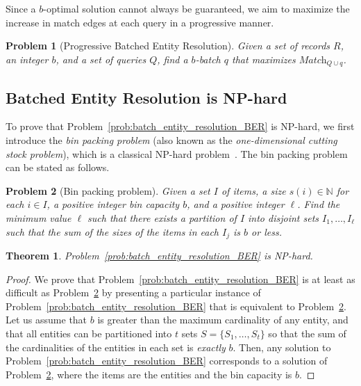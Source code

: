 \documentclass[sigconf, nonacm]{acmart}
\newcommand{\match}{\textit{Match}\xspace}
\newtheorem{theorem}{Theorem}[section]
\newtheorem{problem}{Problem}
\begin{document}
Since a $b$-optimal solution cannot always be guaranteed, we aim to maximize the increase in match edges at each query in a progressive manner.


\begin{problem}[Progressive Batched Entity Resolution]\label{prob:PBER}
    Given a set of records $R$, an integer $b$, and a set of queries $Q$, find a $b$-batch $q$ that maximizes $\match_{Q \cup q}$.
\end{problem}



\subsection{Batched Entity Resolution is NP-hard}\label{sub:BER_NP-hard}

To prove that Problem~\ref{prob:batch_entity_resolution_BER} is NP-hard, we first introduce the \emph{bin packing problem} (also known as the \emph{one-dimensional cutting stock problem}), which is a classical NP-hard problem~\cite{gilmore1961linear}. The bin packing problem can be stated as follows.

\begin{problem}[Bin packing problem]\label{prob:bin}
    Given a set $I$ of items, a size $s(i) \in \mathbb{N}$ for each $i \in I$, a positive integer bin capacity $b$, and a positive integer $\ell$. Find the minimum value $\ell$ such that there exists a partition of $I$ into disjoint sets $I_1,\dots, I_\ell$ such that the sum of the sizes of the items in each $I_j$ is $b$ or less.
\end{problem}


\begin{theorem}\label{th:batch_ER_is_NP-hard}
    Problem~\ref{prob:batch_entity_resolution_BER} is NP-hard.
\end{theorem}
\begin{proof}
    We prove that Problem~\ref{prob:batch_entity_resolution_BER} is at least as difficult as Problem~\ref{prob:bin} by presenting a particular instance of Problem~\ref{prob:batch_entity_resolution_BER} that is equivalent to Problem~\ref{prob:bin}. Let us assume that $b$ is greater than the maximum cardinality of any entity, and that all entities can be partitioned into $t$ sets $S=\{S_1,\ldots,S_t\}$ so that the sum of the cardinalities of the entities in each set is \emph{exactly}  $b$. Then, any solution to Problem~\ref{prob:batch_entity_resolution_BER} corresponds to a solution of Problem~\ref{prob:bin}, where the items are the entities and the bin capacity is $b$.
\end{proof}
\end{document}

